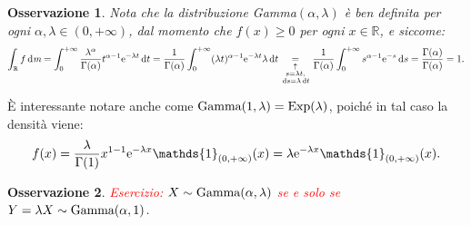 \documentclass[11pt]{book}
\theoremstyle{Definizione}
\theoremstyle{TeoremaProposizioneLemmaCorollario}
\theoremstyle{OsservazioneNota}
\newtheorem{myobs}{Osservazione}[section]
\newcommand{\R}{\mathbb{R}}
\renewcommand{\d}{\mathrm{d}}
\newcommand{\dm}{\,\d \textit{m}}
\newcommand{\dt}{\,\d t}
\newcommand{\ds}{\,\d s}
\newcommand{\e}{\textup{e}}
\newcommand{\uno}[1]{\mathds{1}_{#1}}
\begin{document}
\begin{myobs}
Nota che la distribuzione Gamma$(\alpha,\lambda)$ è ben definita per ogni $\alpha,\lambda\in (0,+\infty)$, dal momento che $f(x) \geq 0$ per ogni $x \in \R$, e siccome:
$$
\int_\R f \dm = \int_0^{+\infty} \frac{\lambda^\alpha}{\Gamma(\alpha)} t^{\alpha-1}\e^{-\lambda t} \dt = \frac{1}{\Gamma(\alpha)}\int_0^{+\infty} (\lambda t)^{\alpha-1} \e^{-\lambda t}\lambda \dt \underset{\substack{ \uparrow\\ s = \lambda t,\\
\ds = \lambda \dt}}{=} \frac{1}{\Gamma(\alpha)}\int_0^{+\infty} s^{\alpha-1}\e^{-s}\ds = \frac{\Gamma(\alpha)}{\Gamma(\alpha)} = 1.
$$
\end{myobs}
È interessante notare anche come $\textup{Gamma}(1,\lambda) = \textup{Exp}(\lambda)$, poiché in tal caso la densità viene:
$$
f(x) = \frac{\lambda}{\Gamma(1)}x^{1-1} \e^{-\lambda x}\uno{(0,+\infty)}(x) = \lambda \e^{-\lambda x} \uno{(0,+\infty)}(x).
$$
\begin{myobs}
\textcolor{red}{Esercizio: $X \sim \textup{Gamma}(\alpha,\lambda)$ se e solo se $Y = \lambda X \sim \textup{Gamma}(\alpha,1)$}.
\end{myobs}
\end{document}
